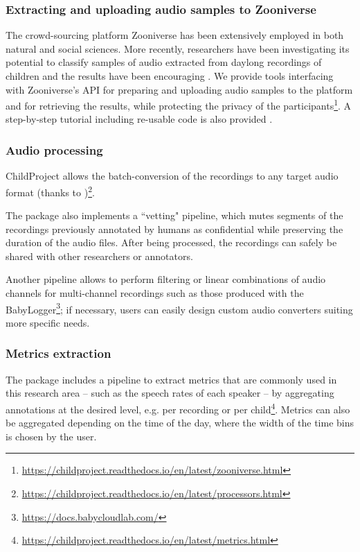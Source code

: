 \documentclass[smallextended]{svjour3}       %
\begin{document}
\subsubsection*{Extracting and uploading audio samples to Zooniverse}

The crowd-sourcing platform Zooniverse \citep{zooniverse} has been extensively employed in both natural \citep{gravityspy} and social sciences. More recently, researchers have been investigating its potential to classify samples of audio extracted from daylong recordings of children and the results have been encouraging  \citep{semenzin2020a,semenzin2020b}. We provide tools interfacing with Zooniverse's API for preparing and uploading audio samples to the platform and for retrieving the results, while protecting the privacy of the participants\footnote{\url{https://childproject.readthedocs.io/en/latest/zooniverse.html}}. A step-by-step tutorial including re-usable code is also provided \citep{zooniverse_example}.

\subsubsection*{Audio processing}

ChildProject allows the batch-conversion of the recordings to any target audio format (thanks to \citealt{ffmpeg})\footnote{\url{https://childproject.readthedocs.io/en/latest/processors.html}}.

The package also implements a ``vetting" \citep{vandam2018vetting,Cychosz2020} pipeline, which mutes segments of the recordings previously annotated by humans as confidential while preserving the duration of the audio files. After being processed, the recordings can safely be shared with other researchers or annotators.

Another pipeline allows to perform filtering or linear combinations of audio channels for multi-channel recordings such as those produced with the BabyLogger\footnote{\url{https://docs.babycloudlab.com/}}; if necessary, users can easily design custom audio converters suiting more specific needs.

\subsubsection*{Metrics extraction}

The package includes a pipeline to extract metrics that are commonly used in this research area -- such as the speech rates of each speaker -- by aggregating annotations at the desired level, e.g. per recording or per child\footnote{\url{https://childproject.readthedocs.io/en/latest/metrics.html}}. Metrics can also be aggregated depending on the time of the day, where the width of the time bins is chosen by the user.
\end{document}
